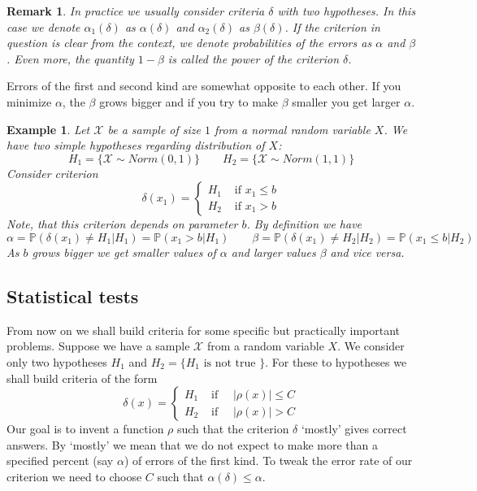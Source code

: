 \documentclass[12pt]{article}
\newtheorem{remark}[theorem]{Remark}
\newtheorem{example}[theorem]{Example}
\begin{document}
\begin{remark} In practice we usually consider criteria $\delta$ with two
    hypotheses. In this case we denote $\alpha_1(\delta)$ as $\alpha(\delta)$
    and $\alpha_2(\delta)$ as $\beta(\delta)$. If the criterion in question is
    clear from the context, we denote probabilities of the errors as $\alpha$
    and $\beta$. Even more, the quantity $1-\beta$ is called the power of the
    criterion $\delta$.
\end{remark}

Errors of the first and second kind are somewhat opposite to each other. If you
minimize $\alpha$, the $\beta$ grows bigger and if you try to make $\beta$
smaller you get larger $\alpha$.

\begin{example} Let $\mathscr{X}$ be a sample of size $1$ from a normal random
    variable $X$. We have two simple hypotheses regarding distribution of $X$:
    $$
        H_1=\{\mathscr{X}\sim Norm(0, 1)\}
        \quad\quad
        H_2=\{\mathscr{X}\sim Norm(1,1)\}
    $$
    Consider criterion
    $$
        \delta(x_1)=
        \begin{cases}
            H_1 & \mbox{ if } x_1\leq b \\
            H_2 & \mbox{ if } x_1> b
        \end{cases}
    $$
    Note, that this criterion depends on parameter $b$. By definition we have
    $$
        \alpha=\mathbb{P}(\delta(x_1)\neq H_1|H_1)=\mathbb{P}(x_1>b|H_1)
        \quad\quad
        \beta=\mathbb{P}(\delta(x_1)\neq H_2|H_2)=\mathbb{P}(x_1\leq b|H_2)
    $$
    As $b$ grows bigger we get smaller values of $\alpha$ and larger values
    $\beta$ and vice versa.
\end{example}


\subsection{Statistical tests}

From now on we shall build criteria for some specific but practically important
problems. Suppose we have a sample $\mathscr{X}$ from a random variable $X$.  We
consider only two hypotheses $H_1$ and $H_2=\{H_1\mbox{ is not true }\}$. For
these to hypotheses we shall build criteria of the form
$$
    \delta(x)=
    \begin{cases}
        H_1 & \mbox{ if }\quad |\rho(x)|\leq C \\
        H_2 & \mbox{ if }\quad |\rho(x)|> C
    \end{cases}
$$
Our goal is to invent a function $\rho$ such that the criterion $\delta$
`mostly' gives correct answers. By `mostly' we mean that we do not expect to 
make more than a specified percent (say $\alpha$) of errors of the first kind. 
To tweak the error rate of our criterion we need to choose $C$ such 
that $\alpha(\delta)\leq \alpha$.
\end{document}
